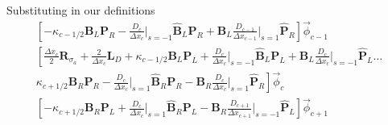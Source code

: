 \documentclass[11pt]{article}
\newcommand{\eqt}[1]{Eq. (\ref{#1})}
\newcommand{\pep}{\, .}
\begin{document}
%
%
Substituting in our definitions
\begin{multline}
\left[ -\kappa_{c-1/2}\mathbf{B}_L\mathbf{P}_R - \frac{D_c}{\Delta x_c} \bigg \lvert_{s=-1} \widehat{\mathbf B}_L  \mathbf{P}_R + \mathbf{B}_L \frac{D_{c-1}}{\Delta x_{c-1}}\bigg \lvert_{s=1} \widehat{\mathbf P}_R \right]\vec{\phi}_{c-1} \\
%
%
\left[\frac{\Delta x_c}{2}\mathbf{R}_{\sigma_a} + \frac{2}{\Delta x_c}\mathbf{L}_D + \kappa_{c-1/2}\mathbf{B}_L\mathbf{P}_L + \frac{D_c}{\Delta x_c} \bigg \lvert_{s=-1} \widehat{\mathbf B}_L \mathbf{P}_L  + \mathbf{B}_L \frac{D_c}{\Delta x_c} \bigg \lvert_{s=-1} \widehat{\mathbf P}_L \dots \right. \\
\left. \kappa_{c+1/2}\mathbf{B}_R \mathbf{P}_R - \frac{D_c}{\Delta x_c}\bigg \lvert_{s=1}\widehat{\mathbf B}_R \mathbf{P}_R -\mathbf{ B}_R \frac{D_c}{\Delta x_c}\bigg \lvert_{s=1} \widehat{\mathbf P}_R \right] \vec{\phi}_c \\
%
%
\left[ -\kappa_{c+1/2}\mathbf{B}_R \mathbf{P}_L + \frac{D_c}{\Delta x_c}\bigg \lvert_{s=1}\widehat{\mathbf B}_R \mathbf{P}_L - \mathbf{ B}_R \frac{D_{c+1}}{\Delta x_{c+1}} \bigg \lvert_{s=-1} \widehat{\mathbf P}_L \right] \vec{\phi}_{c+1}
\end{multline}
%
\end{document}
